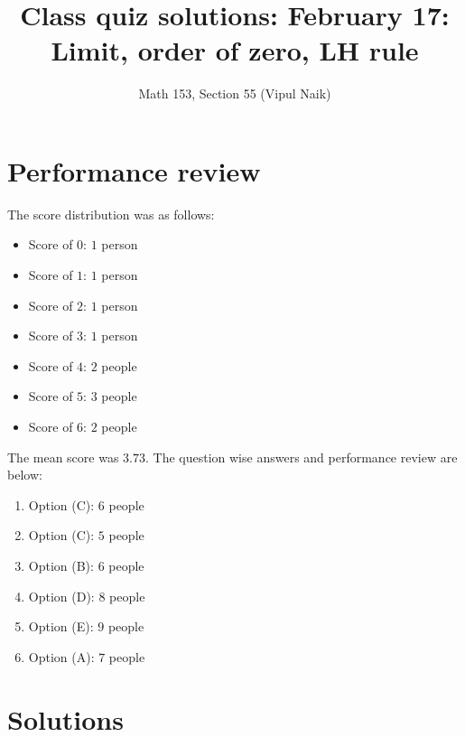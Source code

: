 \documentclass[10pt]{amsart}
\title{Class quiz solutions: February 17: Limit, order of zero, LH rule}
\author{Math 153, Section 55 (Vipul Naik)}
\begin{document}
\maketitle

\section{Performance review}

The score distribution was as follows:

\begin{itemize}
\item Score of $0$: $1$ person
\item Score of $1$: $1$ person
\item Score of $2$: $1$ person
\item Score of $3$: $1$ person
\item Score of $4$: $2$ people
\item Score of $5$: $3$ people
\item Score of $6$: $2$ people
\end{itemize}

The mean score was $3.73$. The question wise answers and performance
review are below:

\begin{enumerate}
\item Option (C): $6$ people
\item Option (C): $5$ people
\item Option (B): $6$ people
\item Option (D): $8$ people
\item Option (E): $9$ people
\item Option (A): $7$ people
\end{enumerate}

\section{Solutions}
\end{document}
